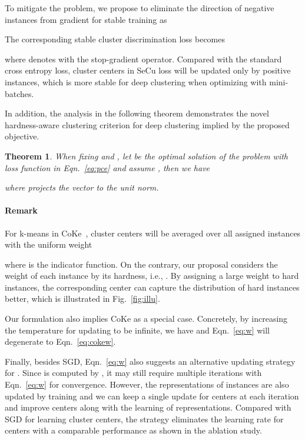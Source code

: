 \documentclass[10pt,twocolumn,letterpaper]{article}
\newtheorem{thm}{Theorem}
\begin{document}
To mitigate the problem, we propose to eliminate the direction of negative instances from gradient for stable training as

The corresponding stable cluster discrimination loss becomes

where  denotes  with the stop-gradient operator. Compared with the standard cross entropy loss, cluster centers in SeCu loss will be updated only by positive instances, which is more stable for deep clustering when optimizing with mini-batches. 

In addition, the analysis in the following theorem demonstrates the novel hardness-aware clustering criterion for deep clustering implied by the proposed objective.

\begin{thm}
When fixing  and , let  be the optimal solution of the problem with loss function in Eqn.~\ref{eq:pce} and assume , then we have

where  projects the vector to the unit norm.
\end{thm}

\paragraph{Remark} For k-means in CoKe~\cite{coke}, cluster centers will be averaged over all assigned instances with the uniform weight

where  is the indicator function.
On the contrary, our proposal considers the weight of each instance by its hardness, i.e., . By assigning a large weight to hard instances, the corresponding center can capture the distribution of hard instances better, which is illustrated in Fig.~\ref{fig:illu}. 

Our formulation also implies CoKe as a special case. Concretely, by increasing the temperature  for updating  to be infinite, we have  and Eqn.~\ref{eq:w} will degenerate to Eqn.~\ref{eq:cokew}.

Finally, besides SGD, Eqn.~\ref{eq:w} also suggests an alternative updating strategy for . Since  is computed by , it may still require multiple iterations with Eqn.~\ref{eq:w} for convergence. However, the representations of instances are also updated by training and we can keep a single update for centers at each iteration and improve centers along with the learning of representations. Compared with SGD for learning cluster centers, the strategy eliminates the learning rate for centers with a comparable performance as shown in the ablation study. 
\end{document}
